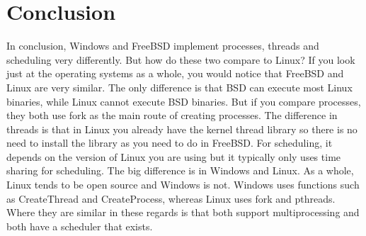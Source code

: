 \documentclass[letterpaper,10pt,titlepage,draftclsnofoot,onecolumn]{IEEEtran}
\begin{document}
\section{Conclusion}

In conclusion, Windows and FreeBSD implement processes, threads and scheduling very differently. But how do these two compare to Linux? If you look just at the operating systems as a whole, you would notice that FreeBSD and Linux are very similar. The only difference is that BSD can execute most Linux binaries, while Linux cannot execute BSD binaries. \cite{BSD} But if you compare processes, they both use fork as the main route of creating processes. The difference in threads is that in Linux you already have the kernel thread library so there is no need to install the library as you need to do in FreeBSD. For scheduling, it depends on the version of Linux you are using but it typically only uses time sharing for scheduling. The big difference is in Windows and Linux. As a whole, Linux tends to be open source and Windows is not. Windows uses functions such as CreateThread and CreateProcess, whereas Linux uses fork and pthreads. Where they are similar in these regards is that both support multiprocessing and both have a scheduler that exists. 


\end{document}
